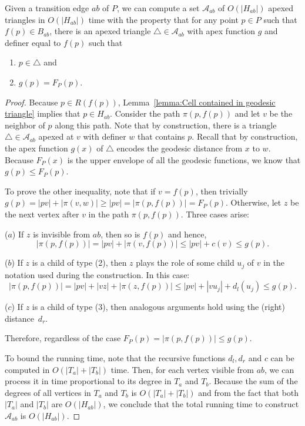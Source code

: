 \documentclass[a4paper,UKenglish]{lipics}
\newcommand{\F}[2]{\ensuremath{F_{\scriptscriptstyle #1}(#2)}}
\newcommand{\ff}[1]{\ensuremath{f(#1)}}
\newcommand{\g}[2]{\ensuremath{|\pi(#1, #2)|}}
\newcommand{\p}[2]{\ensuremath{\pi(#1, #2)}}
\begin{document}
\begin{lemma}\label{lemma:Triangles inside hourglasses}
Given a transition edge $ab$ of $P$, we can compute a set $\mathcal A_{ab}$ of $O(|H_{ab}|)$ apexed triangles in $O(|H_{ab}|)$ time with the property that for any point $p\in P$ such that $\ff{p}\in B_{ab}$,
there is an apexed triangle $\triangle\in \mathcal A_{ab}$ with apex function $g$ and definer equal to $\ff{p}$ such that
\begin{enumerate}
\item $p\in \triangle$ and 
\item $g(p) = \F{P}{p}$.
\end{enumerate}
\end{lemma}
\begin{proof}
Because $p\in R(\ff{p})$, Lemma~\ref{lemma:Cell contained in geodesic triangle} implies that $p\in H_{ab}$. 
Consider the path $\p{p}{\ff{p}}$ and let $v$ be the neighbor of $p$ along this path. 
Note that by construction, there is a triangle $\triangle\in \mathcal A_{ab}$ apexed at $v$ with definer $w$ that contains $p$. 
Recall that by construction, the apex function $g(x)$ of $\triangle$ encodes the geodesic distance from $x$ to $w$. 
Because $\F{P}{x}$ is the upper envelope of all the geodesic functions, we know that $g(p) \leq \F{P}{p}$.

To prove the other inequality, note that if $v = \ff{p}$, then trivially $g(p) = |pv| + \g{v}{w} \geq |pv| = \g{p}{\ff{p}} = \F{P}{p}$. 
Otherwise, let $z$ be the next vertex after $v$ in the path $\p{p}{\ff{p}}$. Three cases arise:

($a$) If $z$ is invisible from $ab$, then so is $\ff{p}$ and hence, 
$$\g{p}{ \ff{p}} = |pv| + \g{v}{ \ff{p}} \leq |pv| + c(v) \leq g(p).$$

($b$) If $z$ is a child of type (2), then $z$ plays the role of some child $u_j$ of $v$ in the notation used during the construction.
In this case:
$$\g{p}{\ff{p}} = |pv| + |v z| + \g{z}{\ff{p}} \leq |pv| + |v u_j| + d_l(u_j) \leq g(p).$$

($c$) If $z$ is a child of type (3), then analogous arguments hold using the (right) distance~$d_r$.

Therefore, regardless of the case $\F{P}{p} = \g{p}{ \ff{p}} \leq g(p)$.

To bound the running time, note that the recursive functions $d_l, d_r$ and $c$ can be computed in $O(|T_a| + |T_b|)$ time. Then, for each vertex visible from $ab$, we can process it in time proportional to its degree in $T_a$ and $T_b$.
Because the sum of the degrees of all vertices in $T_a$ and $T_b$ is $O(|T_a| + |T_b|)$ and from the fact that both $|T_a|$ and $|T_b|$ are $O(|H_{ab}|)$, we conclude that the total running time to construct $\mathcal A_{ab}$ is $O(|H_{ab}|)$.
\end{proof}
\end{document}
